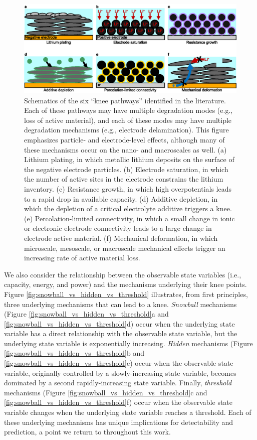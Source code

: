 \documentclass[journal=jpclcd,manuscript=article]{achemso}
\begin{document}
\begin{figure}[h!tb]
\centering
\includegraphics[scale=0.9]{figures/knee_pathways.eps}
\caption{Schematics of the six ``knee pathways'' identified in the literature. Each of these pathways may have multiple degradation modes (e.g., loss of active material), and each of these modes may have multiple degradation mechanisms (e.g., electrode delamination). This figure emphasizes particle- and electrode-level effects, although many of these mechanisms occur on the nano- and macroscales as well.
(a) Lithium plating, in which metallic lithium deposits on the surface of the negative electrode particles.
(b) Electrode saturation, in which the number of active sites in the electrode constrains the lithium inventory.
(c) Resistance growth, in which high overpotentials leads to a rapid drop in available capacity.
(d) Additive depletion, in which the depletion of a critical electrolyte additive triggers a knee.
(e) Percolation-limited connectivity, in which a small change in ionic or electronic electrode connectivity leads to a large change in electrode active material.
(f) Mechanical deformation, in which microscale, mesoscale, or macroscale mechanical effects trigger an increasing rate of active material loss.}
\label{fig:knee_pathways}
\end{figure}

We also consider the relationship between the observable state variables (i.e., capacity, energy, and power) and the mechanisms underlying their knee points. Figure \ref{fig:snowball_vs_hidden_vs_threshold} illustrates, from first principles, three underlying mechanisms that can lead to a knee. \textit{Snowball} mechanisms (Figure \ref{fig:snowball_vs_hidden_vs_threshold}a and \ref{fig:snowball_vs_hidden_vs_threshold}d) occur when the underlying state variable has a direct relationship with the observable state variable, but the underlying state variable is exponentially increasing. \textit{Hidden} mechanisms (Figure \ref{fig:snowball_vs_hidden_vs_threshold}b and \ref{fig:snowball_vs_hidden_vs_threshold}e) occur when the observable state variable, originally controlled by a slowly-increasing state variable, becomes dominated by a second rapidly-increasing state variable. Finally, \textit{threshold} mechanisms (Figure \ref{fig:snowball_vs_hidden_vs_threshold}c and \ref{fig:snowball_vs_hidden_vs_threshold}f) occur when the observable state variable changes when the underlying state variable reaches a threshold. Each of these underlying mechanisms has unique implications for detectability and prediction, a point we return to throughout this work.
\end{document}
